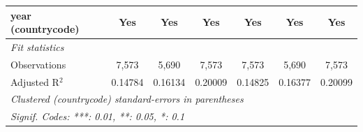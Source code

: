 \begin{tabular}{lcccccc}
   year (countrycode)                                                                              & Yes         & Yes                     & Yes             & Yes      & Yes                     & Yes\\  
   \midrule
   \emph{Fit statistics}\\
   Observations                                                                                    & 7,573       & 5,690                   & 7,573           & 7,573    & 5,690                   & 7,573\\  
   Adjusted R$^2$                                                                                  & 0.14784     & 0.16134                 & 0.20009         & 0.14825  & 0.16377                 & 0.20099\\  
   \midrule \midrule
   \multicolumn{7}{l}{\emph{Clustered (countrycode) standard-errors in parentheses}}\\
   \multicolumn{7}{l}{\emph{Signif. Codes: ***: 0.01, **: 0.05, *: 0.1}}\\
\end{tabular}
\par\endgroup



